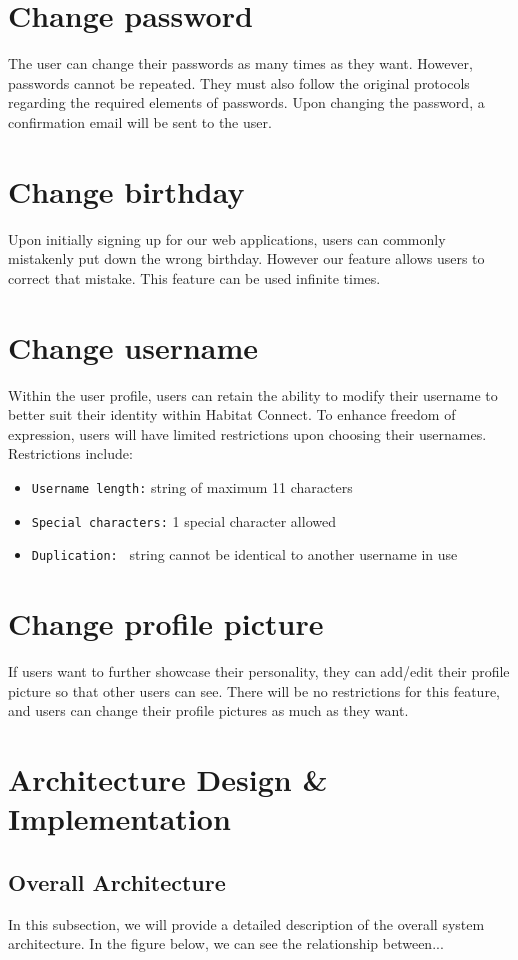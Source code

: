 \documentclass[conference]{IEEEtran}
\begin{document}
\section*{Change password}
The user can change their passwords as many times as they want. However, passwords cannot be repeated. They must also follow the original protocols regarding the required elements of passwords. Upon changing the password, a confirmation email will be sent to the user.

\section*{Change birthday}
Upon initially signing up for our web applications, users can commonly mistakenly put down the wrong birthday. However our feature allows users to correct that mistake. This feature can be used infinite times.

\section*{Change username}
Within the user profile, users can retain the ability to modify their username to better suit their  identity within Habitat Connect. To enhance freedom of expression, users will have limited restrictions upon choosing their usernames. Restrictions include:
\begin{itemize}
    \item \texttt{Username length:} string of maximum 11 characters
    \item \texttt{Special characters:} 1 special character allowed
    \item \texttt{Duplication: } string cannot be identical to another username in use
\end{itemize}

\section*{Change profile picture}
If users want to further showcase their personality, they can add/edit their profile picture so that other users can see. There will be no restrictions for this feature, and users can change their profile pictures as much as they want.


\section{Architecture Design \& Implementation}
\subsection{Overall Architecture}
In this subsection, we will provide a detailed description of the 
overall system architecture. In the figure below, we can see the relationship between... %
\end{document}
